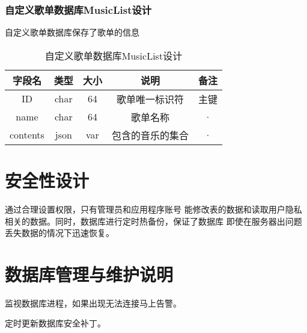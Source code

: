 \subsubsection{自定义歌单数据库MusicList设计}

自定义歌单数据库保存了歌单的信息

\begin{table}[htbp]
	\centering
	\caption{自定义歌单数据库MusicList设计} \label{tab:music-list-database}
	\begin{tabular}{|c|c|c|c|c|}
		\hline
		字段名 & 类型 & 大小 & 说明 & 备注 \\
		\hline
		ID & char & 64 & 歌单唯一标识符 & 主键\\
		\hline
		name & char & 64 & 歌单名称 & · \\
		\hline
		contents & json & var & 包含的音乐的集合  & · \\
		\hline
	\end{tabular}
\end{table}


\section{安全性设计}	
通过合理设置权限，只有管理员和应用程序账号
能修改表的数据和读取用户隐私相关的数据。同时，数据库进行定时热备份，保证了数据库
即使在服务器出问题丢失数据的情况下迅速恢复。

\section{数据库管理与维护说明}
监视数据库进程，如果出现无法连接马上告警。

定时更新数据库安全补丁。